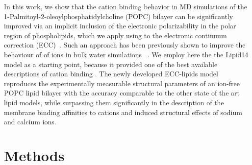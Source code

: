 \documentclass[aip,jcp,twocolumn]{revtex4}
\begin{document}



In this work, we show that the cation binding behavior
in MD simulations of the 1-Palmitoyl-2-oleoylphosphatidylcholine (POPC) bilayer can be significantly 
improved via an implicit inclusion of the electronic polarizability
in the polar region of phospholipids,
which we apply using to the 
electronic continuum correction (ECC)~\cite{leontyev11}.
Such an approach has been previously shown to improve the behaviour of
of ions in bulk water simulations ~\cite{jungwirth17-new-paper-to-be-published,Pluharova2014,kohagen14,kohagen16}. 
We employ here the the Lipid14 model \cite{dickson14} as a starting point,
because it provided one of the best available descriptions of cation binding \cite{catte16}.
The newly developed ECC-lipids model reproduces the experimentally
measurable structural parameters of an ion-free POPC lipid bilayer with the 
accuracy comparable to the other state of the art lipid models, while surpassing
them significantly in the description of the membrane binding affinities to cations and induced
structural effects of sodium and calcium ions.




\section{Methods}
\end{document}
